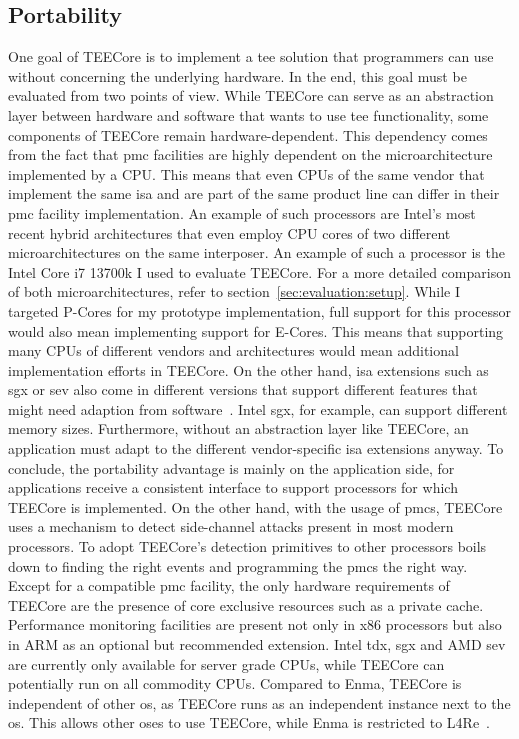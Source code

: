 \subsection{Portability}
\label{eval:compare:portability}
One goal of TEECore is to implement a \gls{tee} solution that programmers can
use without concerning the underlying hardware. In the end, this goal must be
evaluated from two points of view. While TEECore can serve as an abstraction
layer between hardware and software that wants to use \gls{tee} functionality,
some components of TEECore remain hardware-dependent. This dependency comes from
the fact that \gls{pmc} facilities are highly dependent on the microarchitecture
implemented by a CPU. This means that even CPUs of the same vendor that
implement the same \gls{isa} and are part of the same product line can differ in
their \gls{pmc} facility implementation. An example of such processors are
Intel's most recent hybrid architectures that even employ CPU cores of two
different microarchitectures on the same interposer. An example of such a
processor is the Intel Core i7 13700k I used to evaluate TEECore. For a more
detailed comparison of both microarchitectures, refer to
section~\ref{sec:evaluation:setup}. While I targeted P-Cores for my prototype
implementation, full support for this processor would also mean implementing
support for E-Cores. This means that supporting many CPUs of different vendors
and architectures would mean additional implementation efforts in TEECore. On
the other hand, \gls{isa} extensions such as \gls{sgx} or \gls{sev} also come in
different versions that support different features that might need adaption from
software~\cite{el2022benchmarking, intel_sdm, kaplan_amd_2020}. Intel \gls{sgx},
for example, can support different memory sizes. Furthermore, without an
abstraction layer like TEECore, an application must adapt to the different
vendor-specific \gls{isa} extensions anyway. To conclude, the portability
advantage is mainly on the application side, for applications receive a
consistent interface to support processors for which TEECore is implemented. On
the other hand, with the usage of \glspl{pmc}, TEECore uses a mechanism to
detect side-channel attacks present in most modern processors. To adopt
TEECore's detection primitives to other processors boils down to finding the
right events and programming the \glspl{pmc} the right way. Except for a
compatible \gls{pmc} facility, the only hardware requirements of TEECore are the
presence of core exclusive resources such as a private cache. Performance
monitoring facilities are present not only in x86 processors but also in ARM as
an optional but recommended extension. Intel \gls{tdx}, \gls{sgx} and AMD
\gls{sev} are currently only available for server grade CPUs, while TEECore can
potentially run on all commodity CPUs. Compared to Enma, TEECore is independent
of other \gls{os}, as TEECore runs as an independent instance next to the
\gls{os}. This allows other \gls{os}es to use TEECore, while Enma is restricted
to L4Re~\cite{reitz_isolierende_2019}.

